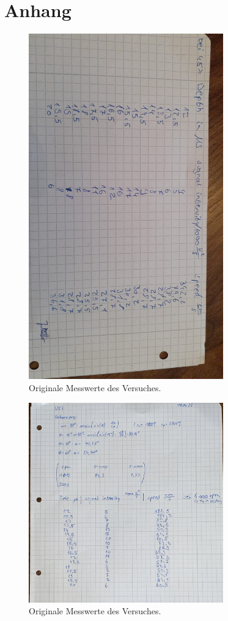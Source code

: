 \section{Anhang}
\label{sec:Anhang}
\begin{figure}
    \centering
    \includegraphics[angle=90, width=0.75\textwidth]{data/origDaten2.jpeg}
    \caption{Originale Messwerte des Versuches.}
    \label{fig:origDaten2}
\end{figure}
\begin{figure}
    \centering
    \includegraphics[width=0.75\textwidth]{data/origDaten1.png}
    \caption{Originale Messwerte des Versuches.}
    \label{fig:origDaten1}
\end{figure}
